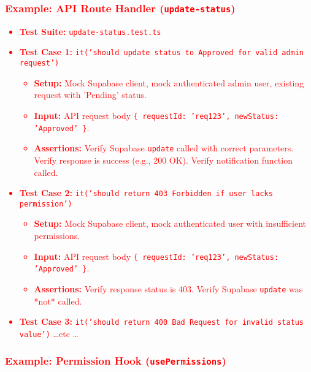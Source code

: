 \documentclass[12pt, titlepage]{article}
\begin{document}
\subsubsection{\textcolor{red}{Example: API Route Handler (\texttt{update-status})}}

\textcolor{red}{
\begin{itemize}
    \item \textbf{Test Suite:} \texttt{update-status.test.ts}
    \item \textbf{Test Case 1:} \texttt{it('should update status to Approved for valid admin request')}
        \begin{itemize}
            \item \textbf{Setup:} Mock Supabase client, mock authenticated admin user, existing request with 'Pending' status.
            \item \textbf{Input:} API request body \texttt{\{ requestId: 'req123', newStatus: 'Approved' \}}.
            \item \textbf{Assertions:} Verify Supabase \texttt{update} called with correct parameters. Verify response is success (e.g., 200 OK). Verify notification function called.
        \end{itemize}
    \item \textbf{Test Case 2:} \texttt{it('should return 403 Forbidden if user lacks permission')}
        \begin{itemize}
            \item \textbf{Setup:} Mock Supabase client, mock authenticated user with insufficient permissions.
            \item \textbf{Input:} API request body \texttt{\{ requestId: 'req123', newStatus: 'Approved' \}}.
            \item \textbf{Assertions:} Verify response status is 403. Verify Supabase \texttt{update} was *not* called.
        \end{itemize}
    \item \textbf{Test Case 3:} \texttt{it('should return 400 Bad Request for invalid status value')}
       \textcolor{red}{\dots etc \dots} %
\end{itemize}
}

\subsubsection{\textcolor{red}{Example: Permission Hook (\texttt{usePermissions})}}
\end{document}
